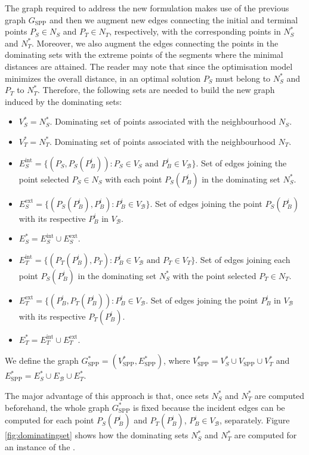 \documentclass[a4paper,  review, authoryear, 1p.]{elsarticle}
\newcommand{\SPPN}{{\sf{H-SPPN}\xspace }}
\newcommand{\VB}{{V^{}_{\mathcal B}}}
\newcommand{\EB}{{E^{}_{\mathcal B}}}
\newcommand{\VS}{{V^{}_{S}}}
\newcommand{\VT}{{V^{}_{T}}}
\newcommand{\GSPP}{{G_{\text{SPP}}}}
\newcommand{\VSPP}{{V_{\text{SPP}}}}
\newcommand{\GSPPS}{{G^{*}_{\text{SPP}}}}
\newcommand{\VSPPS}{{V^{*}_{\text{SPP}}}}
\newcommand{\ESPPS}{{E^{*}_{\text{SPP}}}}
\begin{document}
		The graph required to address the new formulation makes use of the previous graph $\GSPP$ and then we augment new edges connecting the initial and terminal points $P_S\in N_S$ and $P_T\in N_T$, respectively, with the corresponding points in $N_S^*$ and $N_T^*$. Moreover, we also augment the edges connecting the points in the dominating sets with the extreme points of the segments where the minimal distances are attained. The reader may note that since the optimisation model minimizes the overall distance, in an optimal solution $P_S$ must belong to $N_S^*$ and $P_T$ to $N_T^*$.
		Therefore, the following sets are needed  to build the new graph induced by the dominating sets:
		\begin{itemize}
			\item $V_S^*=N^*_S$. Dominating set of points associated with the neighbourhood $N_S$.
			\item $V_T^*=N^*_T$. Dominating set of points associated with the neighbourhood $N_T$.
			\item $E^\text{int}_S=\{(P_S, P_S(P_B^i)):P_S\in\VS\text{ and }P_B^i\in \VB\}$. Set of edges joining the point selected $P_S\in N_S$ with each point $P_S(P_B^i)$ in the dominating set $N^*_S$.
			\item $E^\text{ext}_S=\{(P_S(P_B^i), P_B^i):P_B^i\in\VB\}$. Set of edges joining the point $P_S(P_B^i)$ with its respective $P_B^i$ in $\VB$. 
			\item $E^*_S=E^\text{int}_S\cup E^\text{ext}_S.$
			\item $E^\text{int}_T=\{(P_T(P_B^i), P_T):P_B^i\in \VB\text{ and }P_T\in\VT\}$. Set of edges joining each point $P_S(P_B^i)$ in the dominating set $N^*_S$ with the point selected $P_T\in N_T$. 
			\item $E^\text{ext}_T=\{(P_B^i, P_T(P_B^i)):P_B^i\in\VB$. Set of edges joining the point $P_B^i$ in $\VB$ with its respective $P_T(P_B^i)$. 
			\item $E^*_T=E^\text{int}_T\cup E^\text{ext}_T.$
		\end{itemize}
		We define the graph $\GSPPS=(\VSPPS, \ESPPS)$, where $\VSPPS=V^*_S\cup\VSPP\cup V^*_T$ and $\ESPPS=E^*_S\cup\EB\cup E^*_T.$
		
		
		The major advantage of this approach is that, once sets $N_S^*$ and $N_T^*$ are computed beforehand, the whole graph $\GSPPS$ is fixed because the incident edges can be computed for each point $P_S(P_B^i)$ and $P_T(P_B^i)$, $P_B^i\in V_{\mathcal B}$, separately. 	Figure \ref{fig:dominatingset} shows how the dominating sets $N_S^*$ and $N_T^*$ are computed for an instance of the \SPPN .
		
\end{document}
